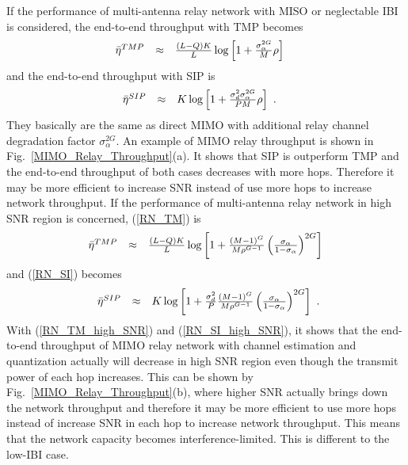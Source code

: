 \documentclass[conference]{IEEEtran}
\begin{document}
If the performance of multi-antenna relay network with MISO or
neglectable IBI is considered, the end-to-end throughput with TMP
becomes
\begin{equation}\hspace{-0.15in}
\begin{array}{rcl}
\bar\eta^{\mbox{\tiny
TMP}}&\approx&\frac{(L-Q)K}{L}\log\left[1+\frac{\sigma_{\alpha}^{2G}}{M}\rho\right]
\end{array}\label{RN_TM_MISO}
\end{equation}
\noindent and the end-to-end throughput with SIP is
\begin{equation}\hspace{-0.23in}
\begin{array}{rcl}
\bar\eta^{\mbox{\tiny
SIP}}&\approx&K\log\left[1+\frac{\sigma_{d}^{2}\sigma_{\alpha}^{2G}}{PM}\rho\right]
\end{array}.\label{RN_SI_MISO}
\end{equation}
\noindent They basically are the same as direct MIMO with
additional relay channel degradation factor
$\sigma_{\alpha}^{2G}$. An example of MIMO relay throughput is
shown in Fig.~\ref{MIMO_Relay_Throughput}(a). It shows that SIP is
outperform TMP and the end-to-end throughput of both cases
decreases with more hops. Therefore it may be more efficient to
increase SNR instead of use more hops to increase network
throughput. If the performance of multi-antenna relay network in
high SNR region is concerned, (\ref{RN_TM}) is
\begin{equation}%
\begin{array}{rcl}
\bar\eta^{\mbox{\tiny
TMP}}&\approx&\frac{(L-Q)K}{L}\log\left[1+\frac{(M-1)^{G}}{M\rho^{G-1}}\left(\frac{\sigma_{\alpha}}{1-\sigma_{\alpha}}\right)^{2G}\right]
\end{array}\label{RN_TM_high_SNR}
\end{equation}
\noindent and (\ref{RN_SI}) becomes
\begin{equation}%
\begin{array}{rcl}
\bar\eta^{\mbox{\tiny
SIP}}&\approx&K\log\left[1+\frac{\sigma_{d}^{2}}{P}\frac{(M-1)^{G}}{M\rho^{G-1}}\left(\frac{\sigma_{\alpha}}{1-\sigma_{\alpha}}\right)^{2G}\right]
\end{array}.\label{RN_SI_high_SNR}
\end{equation}
With (\ref{RN_TM_high_SNR}) and (\ref{RN_SI_high_SNR}), it shows
that the end-to-end throughput of MIMO relay network with channel
estimation and quantization actually will decrease in high SNR
region even though the transmit power of each hop increases. This
can be shown by Fig.~\ref{MIMO_Relay_Throughput}(b), where higher
SNR actually brings down the network throughput and therefore it
may be more efficient to use more hops instead of increase SNR in
each hop to increase network throughput. This means that the
network capacity becomes interference-limited. This is different
to the low-IBI case.
\end{document}
